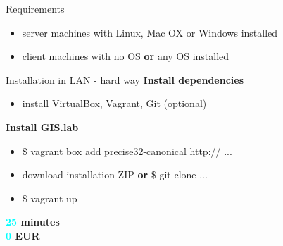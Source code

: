 \documentclass[12pt]{beamer}
\begin{document}
\begin{frame}{Requirements}
	\begin{itemize}
		\item server machines with Linux, Mac OX or Windows installed
		\item client machines with no OS \textbf{or} any OS installed
	\end{itemize}
\end{frame}


\begin{frame}{Installation in LAN - hard way}
	\textbf{Install dependencies}
	\begin{itemize}
		\item install VirtualBox, Vagrant, Git (optional)
	\end{itemize}

	\textbf{Install GIS.lab}
	\begin{itemize}
		\item \$ vagrant box add precise32-canonical http:// ...
		\item download installation ZIP \textbf{or} \$ git clone ...
		\item \$ vagrant up
	\end{itemize}
	\begin{flushleft}
		\textbf{\textcolor{Cyan}{25} minutes} \\
		\textbf{\textcolor{Cyan}{0} EUR} \\
	\end{flushleft}
\end{frame}
\end{document}
